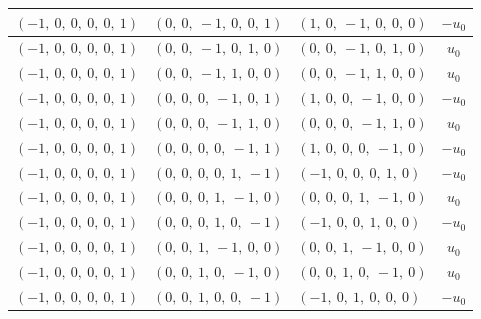 \documentclass[11pt]{article}
\theoremstyle{definition}
\begin{document}
\begin{longtable}{|l|l|l|c|}
    \hline
    $\left( -1, \  0, \  0, \  0, \  0, \  1\right)$ & $\left( 0, \  0, \  -1, \  0, \  0, \  1\right)$ & $\left( 1, \  0, \  -1, \  0, \  0, \  0\right)$ & $- u_{0}$ \\
    \hline
    $\left( -1, \  0, \  0, \  0, \  0, \  1\right)$ & $\left( 0, \  0, \  -1, \  0, \  1, \  0\right)$ & $\left( 0, \  0, \  -1, \  0, \  1, \  0\right)$ & $u_{0}$ \\
    \hline
    $\left( -1, \  0, \  0, \  0, \  0, \  1\right)$ & $\left( 0, \  0, \  -1, \  1, \  0, \  0\right)$ & $\left( 0, \  0, \  -1, \  1, \  0, \  0\right)$ & $u_{0}$ \\
    \hline
    $\left( -1, \  0, \  0, \  0, \  0, \  1\right)$ & $\left( 0, \  0, \  0, \  -1, \  0, \  1\right)$ & $\left( 1, \  0, \  0, \  -1, \  0, \  0\right)$ & $- u_{0}$ \\
    \hline
    $\left( -1, \  0, \  0, \  0, \  0, \  1\right)$ & $\left( 0, \  0, \  0, \  -1, \  1, \  0\right)$ & $\left( 0, \  0, \  0, \  -1, \  1, \  0\right)$ & $u_{0}$ \\
    \hline
    $\left( -1, \  0, \  0, \  0, \  0, \  1\right)$ & $\left( 0, \  0, \  0, \  0, \  -1, \  1\right)$ & $\left( 1, \  0, \  0, \  0, \  -1, \  0\right)$ & $- u_{0}$ \\
    \hline
    $\left( -1, \  0, \  0, \  0, \  0, \  1\right)$ & $\left( 0, \  0, \  0, \  0, \  1, \  -1\right)$ & $\left( -1, \  0, \  0, \  0, \  1, \  0\right)$ & $- u_{0}$ \\
    \hline
    $\left( -1, \  0, \  0, \  0, \  0, \  1\right)$ & $\left( 0, \  0, \  0, \  1, \  -1, \  0\right)$ & $\left( 0, \  0, \  0, \  1, \  -1, \  0\right)$ & $u_{0}$ \\
    \hline
    $\left( -1, \  0, \  0, \  0, \  0, \  1\right)$ & $\left( 0, \  0, \  0, \  1, \  0, \  -1\right)$ & $\left( -1, \  0, \  0, \  1, \  0, \  0\right)$ & $- u_{0}$ \\
    \hline
    $\left( -1, \  0, \  0, \  0, \  0, \  1\right)$ & $\left( 0, \  0, \  1, \  -1, \  0, \  0\right)$ & $\left( 0, \  0, \  1, \  -1, \  0, \  0\right)$ & $u_{0}$ \\
    \hline
    $\left( -1, \  0, \  0, \  0, \  0, \  1\right)$ & $\left( 0, \  0, \  1, \  0, \  -1, \  0\right)$ & $\left( 0, \  0, \  1, \  0, \  -1, \  0\right)$ & $u_{0}$ \\
    \hline
    $\left( -1, \  0, \  0, \  0, \  0, \  1\right)$ & $\left( 0, \  0, \  1, \  0, \  0, \  -1\right)$ & $\left( -1, \  0, \  1, \  0, \  0, \  0\right)$ & $- u_{0}$ \\

\end{longtable}
\end{document}

